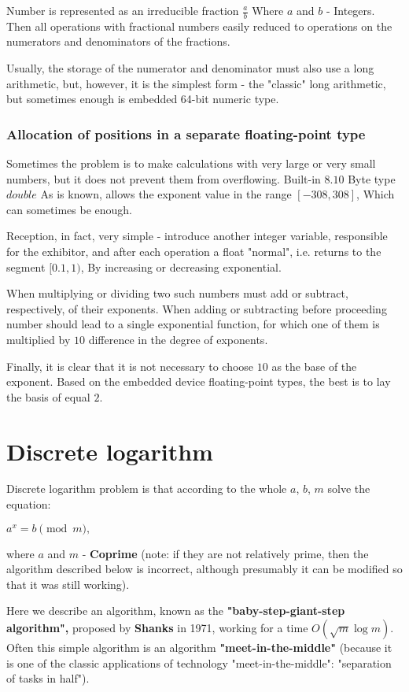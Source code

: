 Number is represented as an irreducible fraction $\frac {a} {b}$ Where $a$ and $b$ - Integers. Then all operations with fractional numbers easily reduced to operations on the numerators and denominators of the fractions.

Usually, the storage of the numerator and denominator must also use a long arithmetic, but, however, it is the simplest form - the "classic" long arithmetic, but sometimes enough is embedded 64-bit numeric type.

\subsubsection{ Allocation of positions in a separate floating-point type }

Sometimes the problem is to make calculations with very large or very small numbers, but it does not prevent them from overflowing. Built-in $8.10$ Byte type $double$ As is known, allows the exponent value in the range $[-308, 308]$, Which can sometimes be enough.

Reception, in fact, very simple - introduce another integer variable, responsible for the exhibitor, and after each operation a float "normal", i.e. returns to the segment $[0.1, 1)$, By increasing or decreasing exponential.

When multiplying or dividing two such numbers must add or subtract, respectively, of their exponents. When adding or subtracting before proceeding number should lead to a single exponential function, for which one of them is multiplied by $10$ difference in the degree of exponents.

Finally, it is clear that it is not necessary to choose $10$ as the base of the exponent. Based on the embedded device floating-point types, the best is to lay the basis of equal $2$.

\section{ Discrete logarithm }
Discrete logarithm problem is that according to the whole $a$, $b$, $m$ solve the equation:

$a ^ x = b \pmod m,$

where $a$ and $m$ - \textbf{Coprime} (note: if they are not relatively prime, then the algorithm described below is incorrect, although presumably it can be modified so that it was still working).

Here we describe an algorithm, known as the \textbf{"baby-step-giant-step algorithm",} proposed by \textbf{Shanks} in 1971, working for a time $O (\sqrt {m} \log m)$. Often this simple algorithm is an algorithm \textbf{"meet-in-the-middle"} (because it is one of the classic applications of technology "meet-in-the-middle": "separation of tasks in half").

